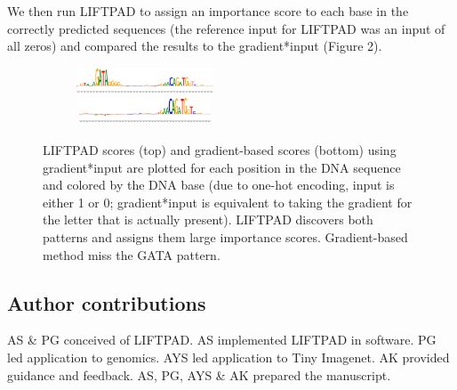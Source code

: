 \documentclass{article}
\begin{document}
We then run LIFTPAD to assign an importance score to each base in the correctly predicted sequences (the reference input for LIFTPAD was an input of all zeros) and compared the results to the gradient*input (Figure 2).

\begin{figure}[!ht]
\begin{center}
\includegraphics[width=230px,height=30px]{LIFTPADSequence2.png}
\includegraphics[width=230px,height=30px]{GradientSequence2.png}
\caption{LIFTPAD scores (top) and gradient-based scores (bottom) using gradient*input are plotted for each position in the DNA sequence and colored by the DNA base (due to one-hot encoding, input is either 1 or 0; gradient*input is equivalent to taking the gradient for the letter that is actually present). LIFTPAD discovers both patterns and assigns them large importance scores. Gradient-based method miss the GATA pattern.}
\end{center}
\end{figure}

\subsection{Author contributions}

AS \& PG conceived of LIFTPAD. AS implemented LIFTPAD in software. PG led application to genomics. AYS led application to Tiny Imagenet. AK provided guidance and feedback. AS, PG, AYS \& AK prepared the manuscript.

%
\nocite{*}


\end{document}
